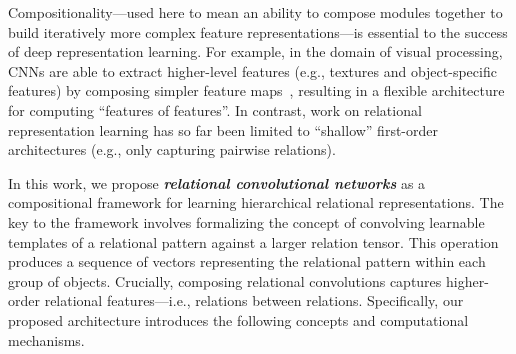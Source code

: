 Compositionality---used here to mean an ability to compose modules together to build iteratively more complex feature representations---is essential to the success of deep representation learning. 
For example, in the domain of visual processing, CNNs are able to extract higher-level features (e.g., textures and object-specific features) by composing simpler feature maps~\citep{zeiler2014visualizing}, resulting in a flexible architecture for computing ``features of features''.
In contrast, work on relational representation learning has so far been limited to ``shallow'' first-order architectures (e.g., only capturing pairwise relations).

In this work, we propose \textit{\bfseries relational convolutional networks} as a compositional framework for learning hierarchical relational representations. The key to the framework involves formalizing the concept of convolving learnable templates of a relational pattern against a larger relation tensor. This operation produces a sequence of vectors representing the relational pattern within each group of objects. Crucially, composing relational convolutions captures higher-order relational features---i.e., relations between relations. Specifically, our proposed architecture introduces the following concepts and computational mechanisms.

